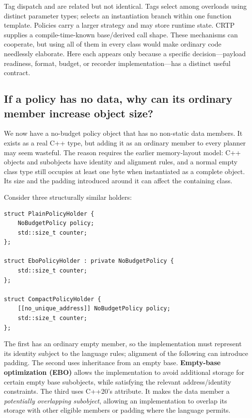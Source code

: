 Tag dispatch and  are related but not identical. Tags select among overloads using distinct parameter types;  selects an instantiation branch within one function template. Policies carry a larger strategy and may store runtime state. CRTP supplies a compile-time-known base/derived call shape. These mechanisms can cooperate, but using all of them in every class would make ordinary code needlessly elaborate. Here each appears only because a specific decision---payload readiness, format, budget, or recorder implementation---has a distinct useful contract.

\subsection{If a policy has no data, why can its ordinary member increase object size?}\label{05-engine-i-ch005-if-a-policy-has-no-data-why-can-its-ordinary-member-increase-object-size}

\hypertarget{05-engine-i-ch005-if-a-policy-has-no-data-why-can-its-ordinary-member-increase-object-size}{}

We now have a no-budget policy object that has no non-static data members. It exists as a real C++ type, but adding it as an ordinary member to every planner may seem wasteful. The reason requires the earlier memory-layout model: C++ objects and subobjects have identity and alignment rules, and a normal empty class type still occupies at least one byte when instantiated as a complete object. Its size and the padding introduced around it can affect the containing class.

Consider three structurally similar holders:

\begin{verbatim}
struct PlainPolicyHolder {
    NoBudgetPolicy policy;
    std::size_t counter;
};

struct EboPolicyHolder : private NoBudgetPolicy {
    std::size_t counter;
};

struct CompactPolicyHolder {
    [[no_unique_address]] NoBudgetPolicy policy;
    std::size_t counter;
};
\end{verbatim}

The first has an ordinary empty member, so the implementation must represent its identity subject to the language rules; alignment of the following  can introduce padding. The second uses inheritance from an empty base. \textbf{Empty-base optimization (EBO)} allows the implementation to avoid additional storage for certain empty base subobjects, while satisfying the relevant address/identity constraints. The third uses C++20's  attribute. It makes the data member a \emph{potentially overlapping subobject}, allowing an implementation to overlap its storage with other eligible members or padding where the language permits.

